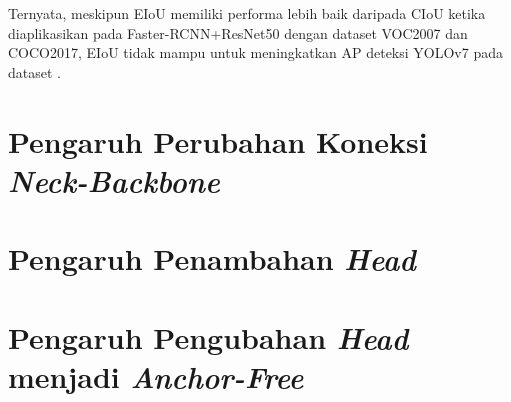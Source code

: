 

Ternyata, meskipun EIoU memiliki performa lebih baik daripada CIoU ketika diaplikasikan
pada Faster-RCNN+ResNet50 dengan dataset VOC2007 dan COCO2017, EIoU tidak mampu untuk meningkatkan
AP deteksi YOLOv7 pada dataset \textcite{aot_dataset}.

\section{Pengaruh Perubahan Koneksi \emph{Neck-Backbone}}

\section{Pengaruh Penambahan \emph{Head}}

\section{Pengaruh Pengubahan \emph{Head} menjadi \emph{Anchor-Free}}
